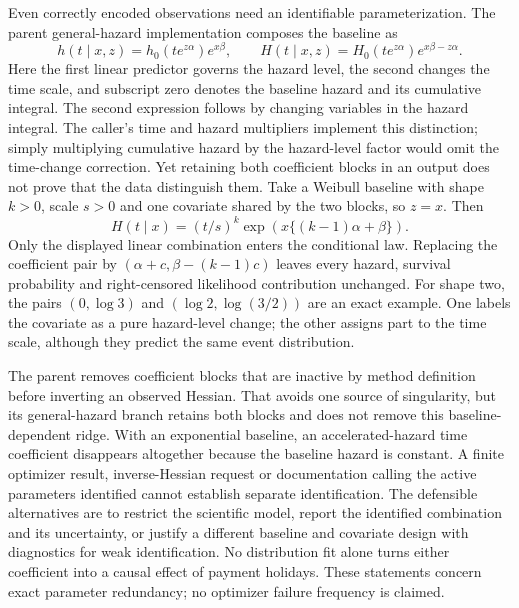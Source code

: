 Even correctly encoded observations need an identifiable parameterization.
The parent general-hazard implementation composes the baseline as
\begin{equation}
 h(t\mid x,z)=h_0(te^{z\alpha})e^{x\beta},\qquad
 H(t\mid x,z)=H_0(te^{z\alpha})e^{x\beta-z\alpha}.
 \label{rel22:gh-composition}
\end{equation}
Here the first linear predictor governs the hazard level, the second changes
the time scale, and subscript zero denotes the baseline hazard and its
cumulative integral. The second expression follows by changing variables in
the hazard integral.
The caller's time and hazard multipliers implement this distinction; simply
multiplying cumulative hazard by the hazard-level factor would omit the
time-change correction. Yet retaining both coefficient blocks in an output
does not prove that the data distinguish them. Take a Weibull baseline with
shape $k>0$, scale $s>0$ and one covariate shared by the two blocks, so $z=x$.
Then
\begin{equation}
 H(t\mid x)=(t/s)^k
       \exp\!\left(x\{(k-1)\alpha+\beta\}\right).
 \label{rel22:weibull-ridge}
\end{equation}
Only the displayed linear combination enters the conditional law. Replacing
the coefficient pair by
$(\alpha+c,\beta-(k-1)c)$ leaves every hazard, survival probability and
right-censored likelihood contribution unchanged. For shape two, the pairs
$(0,\log 3)$ and $(\log 2,\log(3/2))$ are an exact example. One labels the
covariate as a pure hazard-level change; the other assigns part to the time
scale, although they predict the same event distribution.
\citep{rel22survcaller,rel22survwitness}

The parent removes coefficient blocks that are inactive by method definition
before inverting an observed Hessian. That avoids one source of singularity,
but its general-hazard branch retains both blocks and does not remove this
baseline-dependent ridge. With an exponential baseline, an accelerated-hazard
time coefficient disappears altogether because the baseline hazard is
constant. A finite optimizer result, inverse-Hessian request or documentation calling
the active parameters identified cannot establish separate identification. The
defensible alternatives are to restrict the scientific model, report the
identified combination and its uncertainty, or justify a different baseline
and covariate design with diagnostics for weak identification. No distribution
fit alone turns either coefficient into a causal effect of payment holidays.
These statements concern exact parameter redundancy; no optimizer failure
frequency is claimed. \citep{rel22survcaller,rel22survwitness}

